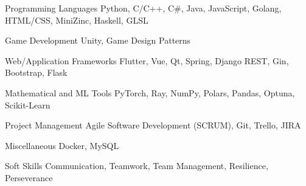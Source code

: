 

\begin{cvskills}

  \cvskill
    {Programming Languages} %
    {Python, C/C++, C\#, Java, JavaScript, Golang, HTML/CSS, MiniZinc, Haskell, GLSL} %

  \cvskill
    {Game Development} %
    {Unity, Game Design Patterns} %

  \ifbool{FullVersion}{
    \cvskill
        {GPU Programming Frameworks} %
        {CUDA and OpenACC} %
    
    \cvskill
        {Graphics Libraries} %
        {OpenGL, GLUT, GLFW, GLEW, SDL} %
  }{    
   \cvskill
    {Graphics and GPU Libraries} %
    {OpenGL, GLUT, GLFW, SDL, CUDA, OpenACC} %
  }


        

  \cvskill
    {Web/Application Frameworks} %
    {Flutter, Vue, Qt, Spring, Django REST, Gin, Bootstrap, Flask} %


  \cvskill
    {Mathematical and ML Tools} %
    {PyTorch, Ray, NumPy, Polars, Pandas, Optuna, Scikit-Learn} %

  \cvskill
    {Project Management} %
    {Agile Software Development (SCRUM), Git, Trello, JIRA} %

  \cvskill
    {Miscellaneous} %
    {Docker, MySQL} %

  \cvskill
    {Soft Skills} %
    {Communication, Teamwork, Team Management, Resilience, Perseverance} %

\end{cvskills}
